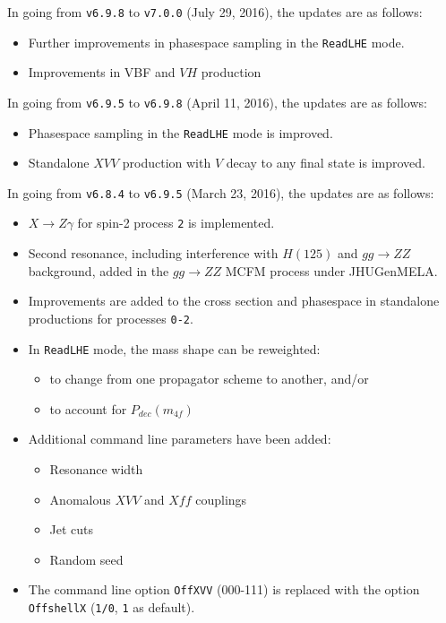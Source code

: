 \documentclass[aps,superscriptaddress,nofootinbib]{revtex4}
\begin{document}
\noindent
In going from \verb|v6.9.8| to \verb|v7.0.0| (July 29, 2016), the updates are as follows:

\begin{itemize}
\item Further improvements in phasespace sampling in the \verb|ReadLHE| mode.
\item Improvements in VBF and $VH$ production
\end{itemize}

\noindent
In going from \verb|v6.9.5| to \verb|v6.9.8| (April 11, 2016), the updates are as follows:

\begin{itemize}
\item Phasespace sampling in the \verb|ReadLHE| mode is improved.
\item Standalone $XVV$ production with $V$ decay to any final state is improved.
\end{itemize}

\noindent
In going from \verb|v6.8.4| to \verb|v6.9.5| (March 23, 2016), the updates are as follows:

\begin{itemize}
\item $X\to Z\gamma$ for spin-2 process \verb|2| is implemented.
\item Second resonance, including interference with $H(125)$ and $gg\to ZZ$ background, added in the $gg\to ZZ$ MCFM process under JHUGenMELA.
\item Improvements are added to the cross section and phasespace in standalone productions for processes \verb|0-2|.
\item In \verb|ReadLHE| mode, the mass shape can be reweighted:
\begin{itemize}
\item to change from one propagator scheme to another, and/or
\item to account for $P_{dec}(m_{4f})$
\end{itemize}
\item Additional command line parameters have been added:
\begin{itemize}
\item Resonance width
\item Anomalous $XVV$ and $Xff$ couplings
\item Jet cuts
\item Random seed
\end{itemize}
\item The command line option \verb|OffXVV| (000-111) is replaced with the option \verb|OffshellX| (\verb|1/0|, \verb|1| as default).
\end{itemize}
\end{document}
